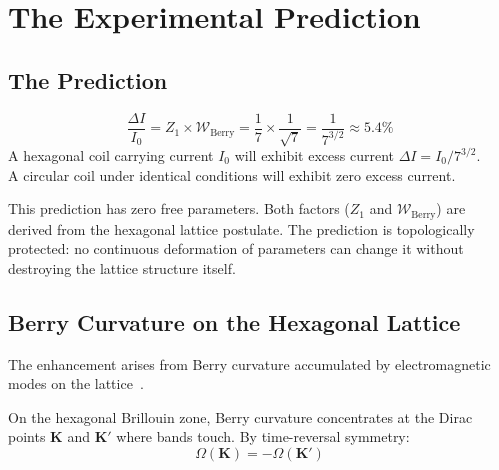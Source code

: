 \documentclass[12pt,a4paper]{article}
\theoremstyle{plain}
\theoremstyle{definition}
\newcommand{\Wberry}{\mathcal{W}_{\mathrm{Berry}}}
\begin{document}
\section{The Experimental Prediction}\label{sec:experiment}

\subsection{The Prediction}

\begin{tcolorbox}[colback=red!3!white, colframe=red!60!black, title=\textbf{Primary Prediction}]
\begin{equation}\label{eq:prediction}
\frac{\Delta I}{I_0} = Z_1 \times \Wberry = \frac{1}{7} \times \frac{1}{\sqrt{7}} = \frac{1}{7^{3/2}} \approx 5.4\%
\end{equation}
A hexagonal coil carrying current $I_0$ will exhibit excess current $\Delta I = I_0/7^{3/2}$. \\
A circular coil under identical conditions will exhibit zero excess current.
\end{tcolorbox}

This prediction has zero free parameters. Both factors ($Z_1$ and $\Wberry$) are derived from the hexagonal lattice postulate. The prediction is topologically protected: no continuous deformation of parameters can change it without destroying the lattice structure itself.

\subsection{Berry Curvature on the Hexagonal Lattice}

The enhancement arises from Berry curvature accumulated by electromagnetic modes on the lattice~\cite{Xiao2010, Berry1984}.

On the hexagonal Brillouin zone, Berry curvature concentrates at the Dirac points $\mathbf{K}$ and $\mathbf{K}'$ where bands touch. By time-reversal symmetry:
\begin{equation}
\Omega(\mathbf{K}) = -\Omega(\mathbf{K}')
\end{equation}
\end{document}
